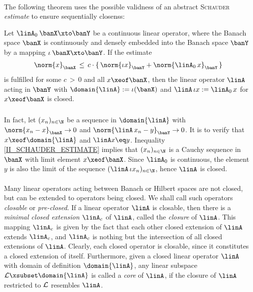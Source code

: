 \documentclass[11pt,twoside]{article}
\begin{document}
\paragraph{} %
The following theorem
uses the possible validness of an abstract \textsc{Schauder} \textit{estimate}
to ensure sequentially closenss:

\begin{theorem1}\label{II_BROWDER_THEOREM}
Let $\linA_0 \: \banX \xto \banY$ be a continuous linear operator,
where the Banach space $\banX$ is continuously and densely embedded
into the Banach space $\banY$ by a mapping $\iota \: \banX \xto \banY$.
If the estimate
\begin{equation}\label{II_SCHAUDER_ESTIMATE}
\norm{x}_{\banX} \, \leq \,
c \cdot
\{ \,\norm{\iota x}_{\banY} + \norm{\linA_0 \, x}_{\banY} \, \}
\end{equation}
is fulfilled for some $c {\,>\,} 0$ and all $x \xeof \banX$,
then the linear operator $\linA$ acting in $\banY$ with
$\domain{\linA} := \iota(\banX)$ and
$\linA\, \iota x := \linA_0 \, x$ for $x \xeof \banX$ is closed.
\end{theorem1}

\subparagraph{} %
In fact,
let $(x_n)_{n \in \N}$ be a sequence in $\domain{\linA}$
with $\norm{x_n-x}_{\banX} \to 0$
and $\norm{\linA \,x_n-y}_{\banY} \to 0$.
It is to verify that $x \xeof \domain{\linA}$ and $\linA x \eq y$.
Inequality \eqref{II_SCHAUDER_ESTIMATE} implies that
$(x_n)_{n \in \N}$ is a Cauchy sequence in $\banX$
with limit element $x \xeof \banX$.
Since $\linA_0$ is continuous,
the element $y$ is also the limit
of the sequence $(\linA \, \iota x_n)_{n \in \N}$,
hence $\linA$ is closed.

\paragraph{} %
Many linear operators acting between Banach or Hilbert spaces are not closed,
but can be extended to operators being closed.
We shall call such operators \textit{closable} or \textit{pre-closed}.
If a linear operator $\linA$ is closable,
then there is a \textit{minimal closed extension} $\linA_c$ of $\linA$,
called the \textit{closure} of $\linA$.
This mapping $\linA_c$ is given by the fact
that each other closed extension of $\linA$ extends $\linA_c$,
and $\linA_c$ is nothing but the intersection
of all closed extensions of $\linA$.
Clearly,
each closed operator is closable,
since it constitutes a closed extension of itself.
Furthermore,
given a closed linear operator $\linA$
with domain of definition $\domain{\linA}$,
any linear subspace $\cal{L} \xsubset \domain{\linA}$
is called a \textit{core} of $\linA$,
if the closure of $\linA$ restricted to $\cal{L}$ resembles $\linA$.
\end{document}
